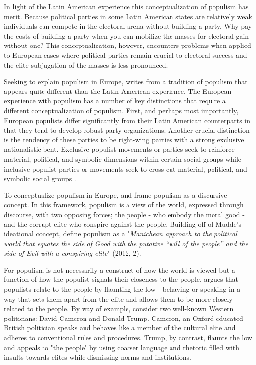 \documentclass[a4paper,12pt]{article}\usepackage[]{graphicx}\usepackage[]{color}
\begin{document}
In light of the Latin American experience this conceptualization of populism has merit. Because political parties in some Latin American states are relatively weak \citep{levitsky2016challenges} individuals can compete in the electoral arena without building a party. Why pay the costs of building a party when you can mobilize the masses for electoral gain without one? This conceptualization, however, encounters problems when applied to European cases where political parties remain crucial to electoral success and the elite subjugation of the masses is less pronounced. 
\par
Seeking to explain populism in Europe, \citet{mudde2007populist} writes from a tradition of populism that appears quite different than the Latin American experience. The European experience with populism has a number of key distinctions that require a different conceptualization of populism. First, and perhaps most importantly, European populists differ significantly from their Latin American counterparts in that they tend to develop robust party organizations. Another crucial distinction is the tendency of these parties to be right-wing parties with a strong exclusive nationalistic bent. Exclusive populist movements or parties seek to reinforce material, political, and symbolic dimensions within certain social groups while inclusive populist parties or movements seek to cross-cut material, political, and symbolic social groups \citep{mudde2013exclusionary}. 
\par
To conceptualize populism in Europe, \citet{mudde2007populist} and \citet{mudde2013exclusionary} frame populism as a discursive concept. In this framework, populism is a view of the world, expressed through discourse, with two opposing forces; the people - who embody the moral good - and the corrupt elite who conspire against the people. Building off of Mudde's ideational concept, \citet{hawkins2012measuring} define populism as a "\textit{Manichean approach to the political world that equates the side of Good with the putative “will of the people” and the side of Evil with a conspiring elite}" (2012, 2). 
\par
For \citet{ostiguy2009high, ostiguy2009highlow, ostiguy2013flaunting} populism is not necessarily a construct of how the world is viewed but a function of how the populist signals their closeness to the people. \citet{ostiguy2013flaunting} argues that populists relate to the people by flaunting the low - behaving or speaking in a way that sets them apart from the elite and allows them to be more closely related to the people. By way of example, consider two well-known Western politicians: David Cameron and Donald Trump. Cameron, an Oxford educated British politician speaks and behaves like a member of the cultural elite and adheres to conventional rules and procedures. Trump, by contrast, flaunts the low and appeals to "the people" by using coarser language and rhetoric filled with insults towards elites while dismissing norms and institutions. 
\end{document}
